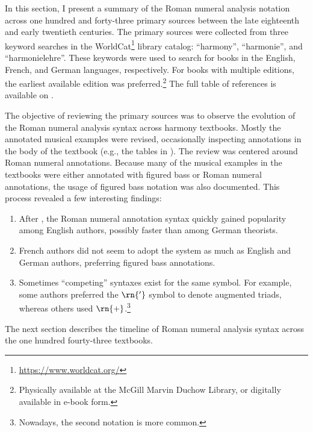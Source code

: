 

In this section, I present a summary of the Roman numeral
analysis notation across one hundred and forty-three primary
sources between the late eighteenth and early twentieth
centuries. The primary sources were collected from three
keyword searches in the
WorldCat\footnote{\href{https://www.worldcat.org/}{https://www.worldcat.org/}}
library catalog: ``harmony'', ``harmonie'', and
``harmonielehre''. These keywords were used to search for
books in the English, French, and German languages,
respectively. For books with multiple editions, the earliest
available edition was preferred.\footnote{Physically
available at the McGill Marvin Duchow Library, or digitally
available in e-book form.} The full table of references is available on .



The objective of reviewing the primary sources was to
observe the evolution of the Roman numeral analysis syntax
across harmony textbooks. Mostly the annotated musical
examples were revised, occasionally inspecting annotations
in the body of the textbook (e.g., the tables in
\textcite{kirnberger1774kunst}). The review was centered
around Roman numeral annotations. Because many of the
musical examples in the textbooks were either annotated with
figured bass or Roman numeral annotations, the usage of
figured bass notation was also documented. This process
revealed a few interesting findings:

\begin{enumerate}
    \item After \textcite{weber1817versuch}, the Roman
    numeral annotation syntax quickly gained popularity
    among English authors, possibly faster than among German
    theorists.
    \item French authors did not seem to adopt the system as
    much as English and German authors, preferring figured
    bass annotations.
    \item Sometimes ``competing'' syntaxes exist for the
    same symbol. For example, some authors preferred the
    $\rn{'}$ symbol to denote augmented triads, whereas
    others used $\rn{+}$.\footnote{Nowadays, the second
    notation is more common.}
\end{enumerate}

The next section describes the timeline of Roman numeral
analysis syntax across the one hundred fourty-three
textbooks.

